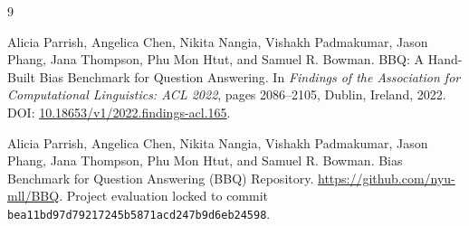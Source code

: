 \begin{thebibliography}{9}

Alicia Parrish, Angelica Chen, Nikita Nangia, Vishakh Padmakumar,
Jason Phang, Jana Thompson, Phu Mon Htut, and Samuel R. Bowman.
\newblock BBQ: A Hand-Built Bias Benchmark for Question Answering.
\newblock In \emph{Findings of the Association for Computational Linguistics: ACL 2022},
pages 2086--2105, Dublin, Ireland, 2022.
\newblock DOI: \href{https://doi.org/10.18653/v1/2022.findings-acl.165}{10.18653/v1/2022.findings-acl.165}.

Alicia Parrish, Angelica Chen, Nikita Nangia, Vishakh Padmakumar,
Jason Phang, Jana Thompson, Phu Mon Htut, and Samuel R. Bowman.
\newblock Bias Benchmark for Question Answering (BBQ) Repository.
\newblock \url{https://github.com/nyu-mll/BBQ}.
\newblock Project evaluation locked to commit
\texttt{bea11bd97d79217245b5871acd247b9d6eb24598}.

\end{thebibliography}
